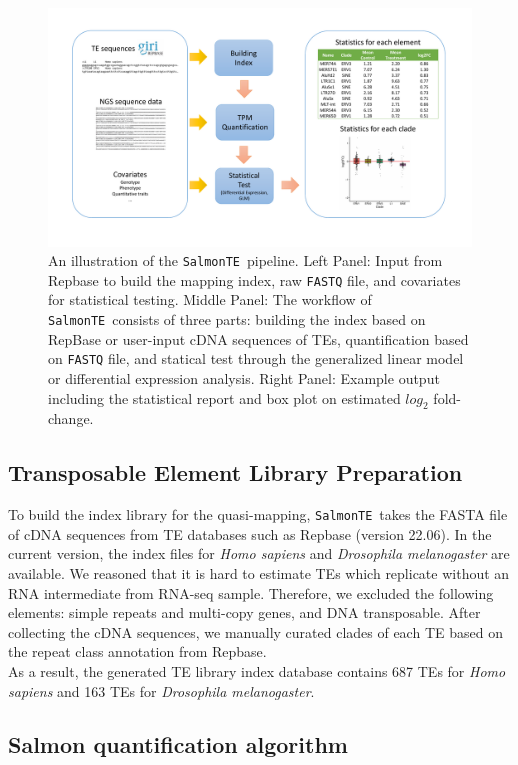 \documentclass[wsdraft]{ws-procs11x85}
\newcommand{\SalmonTE}{\texttt{SalmonTE}}
\begin{document}
\begin{figure}[h]
\centerline{
\includegraphics[width=14cm]{fig1.pdf}
}
\caption{An illustration of the \SalmonTE~pipeline. Left Panel: Input from Repbase to build the mapping index, raw \texttt{FASTQ} file, and covariates for statistical testing.  Middle Panel: The workflow of \SalmonTE~consists of three parts: building the index based on RepBase or user-input cDNA sequences of TEs, quantification based on \texttt{FASTQ} file, and statical test through the generalized linear model or differential expression analysis. Right Panel: Example output including the statistical report and box plot on estimated $log_2$ fold-change.}
\label{aba:fig1}
\end{figure}

\subsection{Transposable Element Library Preparation}
To build the index library for the quasi-mapping, \SalmonTE~takes the FASTA file of cDNA sequences from TE databases such as Repbase (version 22.06)\cite{repbase}. In the current version, the index files for \textit{Homo sapiens} and \textit{Drosophila melanogaster} are available. 
We reasoned that it is hard to estimate TEs which replicate without an RNA intermediate from RNA-seq sample. Therefore, we excluded the following elements: simple repeats and multi-copy genes, and DNA transposable. After collecting the cDNA sequences, we manually curated clades of each TE based on the repeat class annotation from Repbase. \\
As a result, the generated TE library index database contains 687 TEs for \textit{Homo sapiens} and 163 TEs for \textit{Drosophila melanogaster}.

\subsection{Salmon quantification algorithm}
\end{document}
